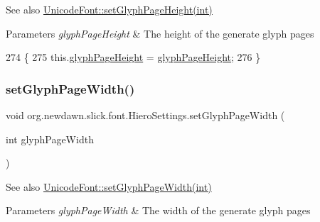 \begin{DoxySeeAlso}{See also}
\mbox{\hyperlink{classorg_1_1newdawn_1_1slick_1_1_unicode_font_aae86b4ba382762f890288ca53127074e}{Unicode\+Font\+::set\+Glyph\+Page\+Height(int)}}
\end{DoxySeeAlso}

\begin{DoxyParams}{Parameters}
{\em glyph\+Page\+Height} & The height of the generate glyph pages \\
\hline
\end{DoxyParams}

\begin{DoxyCode}
274                                                         \{
275         this.\mbox{\hyperlink{classorg_1_1newdawn_1_1slick_1_1font_1_1_hiero_settings_a17c4e911610ef26561713830e4998cc1}{glyphPageHeight}} = \mbox{\hyperlink{classorg_1_1newdawn_1_1slick_1_1font_1_1_hiero_settings_a17c4e911610ef26561713830e4998cc1}{glyphPageHeight}};
276     \}
\end{DoxyCode}
\mbox{\label{classorg_1_1newdawn_1_1slick_1_1font_1_1_hiero_settings_aedb1b75ca8b2af6ec520b0779fd9fbe9}} 
\subsubsection{\texorpdfstring{set\+Glyph\+Page\+Width()}{setGlyphPageWidth()}}
{\footnotesize\ttfamily void org.\+newdawn.\+slick.\+font.\+Hiero\+Settings.\+set\+Glyph\+Page\+Width (\begin{DoxyParamCaption}\item[{int}]{glyph\+Page\+Width }\end{DoxyParamCaption})\hspace{0.3cm}{\ttfamily [inline]}}

\begin{DoxySeeAlso}{See also}
\mbox{\hyperlink{classorg_1_1newdawn_1_1slick_1_1_unicode_font_a83fbec1e5c863d4b3fbe77d9e9df740f}{Unicode\+Font\+::set\+Glyph\+Page\+Width(int)}}
\end{DoxySeeAlso}

\begin{DoxyParams}{Parameters}
{\em glyph\+Page\+Width} & The width of the generate glyph pages \\
\hline
\end{DoxyParams}

